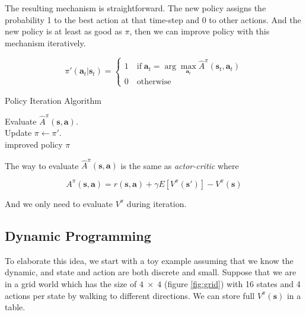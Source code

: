 \documentclass{tufte-handout}
\newcommand{\s}{\mathbf{s}}
\newcommand{\act}{\mathbf{a}}
\begin{document}
The resulting mechanism is straightforward. The new policy assigns the probability 1 to the best action at that time-step and 0 to other actions. And the new policy is at least as good as $\pi$, then we can improve policy with this mechanism iteratively.

\begin{equation}
\label{eq:1}
\pi'(\act_t | \s_t) = \begin{cases}
1 \quad \text{if} \; \act_t = \arg \max_{\act_t} \hat{A}^\pi(\s_t, \act_t) \\
0 \quad \text{otherwise}
\end{cases}
\end{equation}

\begin{algorithm}
  \caption{Policy Iteration Algorithm}
    \label{algo:policyiter}
    \begin{algorithmic}[1]
    \STATE Evaluate $\hat{A} ^\pi(\s, \act)$. \\
    \STATE Update $ \pi \leftarrow \pi'$. \\
    \ENDWHILE
    \RETURN improved policy $\pi$  %
  \end{algorithmic}
\end{algorithm}

The way to evaluate $\hat{A} ^\pi(\s, \act)$ is the same as \emph{actor-critic} where

\begin{equation}
\label{eq:2}
A^\pi (\s, \act) = r(\s, \act) + \gamma E[V^\pi(\s')] - V^\pi(\s)
\end{equation}

And we only need to evaluate $V^\pi$ during iteration.

\subsection{Dynamic Programming}

To elaborate this idea, we start with a toy example assuming that we know the dynamic, and state and action are both discrete and small. Suppose that we are
in a grid world which has the size of $4 \; \times \; 4$ (figure \ref{fig:grid}) with 16 states and 4 actions per state by walking to different directions. We can store full $V^\pi (\s)$ in a table.
\end{document}

